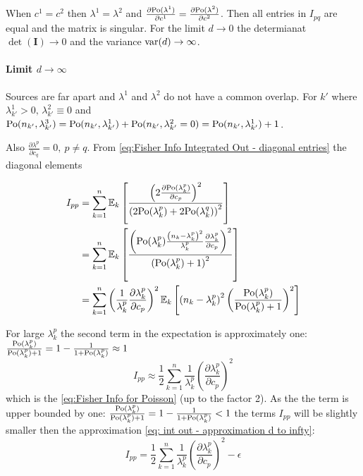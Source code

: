 When $c^1=c^2$ then $\lambda^1=\lambda^2$ and $\frac{\partial\mathrm{Po}(\lambda^1)}{\partial c^1}=\frac{\partial\mathrm{Po}(\lambda^2)}{\partial c^2}$. Then all entries in $I_{pq}$ are equal and the matrix is singular. For the limit $d\rightarrow0$ the determianat $\det(\bm{I})\rightarrow0$ and the variance $\mathrm{var}(d)\rightarrow\infty$.

\paragraph{Limit $d\rightarrow\infty$}

Sources are far apart and $\lambda^1$ and $\lambda^2$ do not have a common overlap. For $k'$ where $\lambda_{k'}^1>0,\,\lambda_{k'}^2\equiv0$ and $\mathrm{Po}(n_{k'},\lambda_{k'}^3)=\mathrm{Po}(n_{k'},\lambda_{k'}^1)+\mathrm{Po}(n_{k'},\lambda_{k'}^2=0)=\mathrm{Po}(n_{k'},\lambda_{k'}^1)+1$.

Also $\frac{\partial\lambda^p}{\partial c_q}=0,\: p\neq q$. From \autoref{eq:Fisher Info Integrated Out - diagonal entries} the diagonal
elements 

\begin{alignat*}{1}
	I_{pp} & =\sum_{k=1}^n\mathbb{E}_k\left[\frac{\left(2\frac{\partial\mathrm{Po}(\lambda_k^p)}{\partial c_p}\right)^2}{\left(2\mathrm{Po}(\lambda_k^p)+2\mathrm{Po}(\lambda_k^q)\right)^2}\right]\\
	 & =\sum_{k=1}^n\mathbb{E}_k\left[\frac{\left(\mathrm{Po}(\lambda_k^p)\frac{\left(n_k-\lambda_k^p\right)^2}{\lambda_k^p}\frac{\partial\lambda_k^p}{\partial c_p}\right)^2}{\left(\mathrm{Po}(\lambda_k^p)+1\right)^2}\right]\\
	 & =\sum_{k=1}^n\left(\frac{1}{\lambda_k^p}\frac{\partial\lambda_k^p}{\partial c_p}\right)^2\mathbb{E}_k\left[\left(n_k-\lambda_k^p\right)^2\left(\frac{\mathrm{Po}(\lambda_k^p)}{\mathrm{Po}(\lambda_k^p)+1}\right)^2\right]
\end{alignat*}

For large $\lambda_k^p$ the second term in the expectation is approximately one: $\frac{\mathrm{Po}(\lambda_k^p)}{\mathrm{Po}(\lambda_k^p)+1}=1-\frac{1}{1+\mathrm{Po}(\lambda_k^p)}\approx1$
%
\begin{equation}
	I_{pp}\approx\frac{1}{2}\sum_{k=1}^n\frac{1}{\lambda_k^p}\left(\frac{\partial\lambda_k^p}{\partial c_p}\right)^2\label{eq: int out - approximation d to infty}
\end{equation}
%
which is the \autoref{eq:Fisher Info for Poisson} (up to the factor 2). As the the term is upper bounded by one: $\frac{\mathrm{Po}(\lambda_k^p)}{\mathrm{Po}(\lambda_k^p)+1}=1-\frac{1}{1+\mathrm{Po}(\lambda_k^p)}<1$ the terms $ $$I_{pp}$ will be slightly smaller then the approximation \autoref{eq: int out - approximation d to infty}:
%
\begin{equation}
	I_{pp}=\frac{1}{2}\sum_{k=1}^n\frac{1}{\lambda_k^p}\left(\frac{\partial\lambda_k^p}{\partial c_p}\right)^2-\epsilon
	\label{eq:int out d to infty}
\end{equation}

